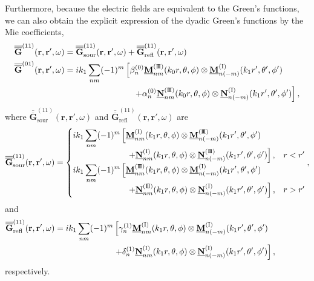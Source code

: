 \documentclass[journal=jacsat,manuscript=article,layout=traditional]{achemso}
\newcommand*\tensorg{\overline{\overline{\mathbf{G}}}}
\newcommand{\norF}[1]{\underline{\vb{#1}}}
\newcommand{\joinR}{\hspace{-.17em}}
\newcommand{\RomanI}{\scriptsize\textrm{I}}
\newcommand{\RomanIII}{\mbox{\RomanI\joinR\RomanI\joinR\RomanI}}
\begin{document}
\begin{appendix}
Furthermore, because the electric fields are equivalent to the Green's functions, we can also obtain the explicit expression of the dyadic Green's functions by the Mie coefficients,
\begin{align}
    \tensorg^{(11)}(\mathbf{r,r'},\omega)&=
    \tensorg_\mathrm{sour}^{(11)}(\mathbf{r,r'},\omega)+
    \tensorg_\mathrm{refl}^{(11)}(\mathbf{r,r'},\omega)\\
    \nonumber
    \tensorg^{(01)}(\mathbf{r,r'},\omega)&=
    ik_1 \sum_{nm}(-1)^m
    \left[\beta_n^{(0)}\norF{M}_{\mathstrut{nm}}^{(\RomanIII)}(k_0r,\theta,\phi)
    \otimes\norF{M}_{n(-m)}^{(\RomanI)}(k_1r',\theta',\phi')\right.\\
    &\hspace{2.85 cm}
    \left.+\alpha_n^{(0)}\norF{N}_{\mathstrut{nm}}^{(\RomanIII)}(k_0r,\theta,\phi)\otimes
    \norF{N}_{n(-m)}^{(\RomanI)}(k_1r',\theta',\phi')\right],
\end{align}
where $\tensorg_\mathrm{sour}^{(11)}(\mathbf{r,r'},\omega)$ and $\tensorg_\mathrm{refl}^{(11)}(\mathbf{r,r'},\omega)$ are
\begin{align}
    \label{G11sour}
    \overline{\overline{\mathbf{G}}}_\mathrm{sour}^{(11)}(\mathbf{r,r'},\omega)=
    \begin{cases}
        \displaystyle
        ik_1 \sum_{nm}(-1)^m\left[\norF{M}_{\mathstrut{nm}}^{(\RomanI)}(k_1r,\theta,\phi)
        \otimes\norF{M}_{n(-m)}^{(\RomanIII)}(k_1r',\theta',\phi')\right.\\
        \hspace{2.34cm}\left.+\norF{N}_{\mathstrut{nm}}^{(\RomanI)}(k_1r,\theta,\phi)
        \otimes\norF{N}_{n(-m)}^{(\RomanIII)}(k_1r',\theta',\phi')\right], & r < r'\\
        \displaystyle
        ik_1 \sum_{nm}(-1)^m\left[\norF{M}_{\mathstrut{nm}}^{(\RomanIII)}(k_1r,\theta,\phi)
        \otimes\norF{M}_{n(-m)}^{(\RomanI)}(k_1r',\theta',\phi')\right.\\
        \hspace{2.34cm}\left.+\norF{N}_{\mathstrut{nm}}^{(\RomanIII)}(k_1r,\theta,\phi)
        \otimes\norF{N}_{n(-m)}^{(\RomanI)}(k_1r',\theta',\phi')\right], & r > r'
    \end{cases},%
\end{align}
and 
\begin{align}
    \nonumber
    \overline{\overline{\mathbf{G}}}_\mathrm{refl}^{(11)}(\mathbf{r,r'},\omega)=
    ik_1 \sum_{nm}(-1)^m
    &\left[\gamma_n^{(1)}\norF{M}_{\mathstrut{nm}}^{(\RomanI)}(k_1r,\theta,\phi)
    \otimes\norF{M}_{n(-m)}^{(\RomanI)}(k_1r',\theta',\phi')\right.\\
    &\left.+\delta_n^{(1)}\norF{N}_{\mathstrut{nm}}^{(\RomanI)}(k_1r,\theta,\phi)\otimes\norF{N}_{n(-m)}^{(\RomanI)}(k_1r',\theta',\phi')\right],\hspace{1.42 cm}
    \label{G11refl}
\end{align}
respectively.
\newpage
\end{appendix}
\newpage








%

\end{document}
